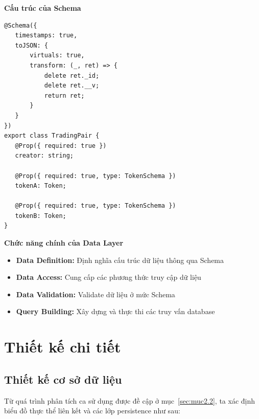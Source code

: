 \begin{description}
          \textbf{Cấu trúc của Schema}
          \begin{lstlisting}
@Schema({
   timestamps: true,
   toJSON: {
       virtuals: true,
       transform: (_, ret) => {
           delete ret._id;
           delete ret.__v;
           return ret;
       }
   }
})
export class TradingPair {
   @Prop({ required: true })
   creator: string;

   @Prop({ required: true, type: TokenSchema })
   tokenA: Token;

   @Prop({ required: true, type: TokenSchema })
   tokenB: Token;
}
\end{lstlisting}

          \textbf{Chức năng chính của Data Layer}
          \begin{itemize}
              \item \textbf{Data Definition:} Định nghĩa cấu trúc dữ liệu thông qua Schema
              \item \textbf{Data Access:} Cung cấp các phương thức truy cập dữ liệu
              \item \textbf{Data Validation:} Validate dữ liệu ở mức Schema
              \item \textbf{Query Building:} Xây dựng và thực thi các truy vấn database
          \end{itemize}
\end{description}

\section{Thiết kế chi tiết}
\subsection{Thiết kế cơ sở dữ liệu}
Từ quá trình phân tích ca sử dụng được đề cập ở mục~\ref{sec:muc2.2}, ta xác định biểu đồ thực thể liên kết và các lớp persistence như sau:

